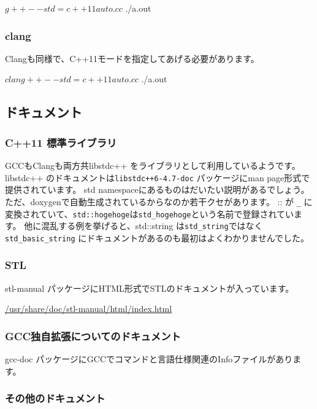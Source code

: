 \documentclass[mingoth,a4paper]{jsarticle}
\begin{document}
\begin{commandline}
$ g++ --std=c++11 auto.cc
$ ./a.out
\end{commandline}

\subsubsection{clang}

Clangも同様で、C++11モードを指定してあげる必要があります。

\begin{commandline}
$ clang++ --std=c++11 auto.cc 
$ ./a.out
\end{commandline}

\subsection{ドキュメント}

\subsubsection{C++11 標準ライブラリ}

GCCもClangも両方共libstdc++ をライブラリとして利用しているようです。
libstdc++ のドキュメントは\texttt{libstdc++6-4.7-doc} パッケージにman
page形式で提供されています。
std namespaceにあるものはだいたい説明があるでしょう。
ただ、doxygenで自動生成されているからなのか若干クセがあります。
:: が \verb!_! に変換されていて、\verb!std::hogehoge!は\verb!std_hogehoge!という名前で登録されています。
他に混乱する例を挙げると、std::string は\verb!std_string!ではなく
\verb!std_basic_string! にドキュメントがあるのも最初はよくわかりませんでした。

\subsubsection{STL}

stl-manual パッケージにHTML形式でSTLのドキュメントが入っています。

\url{/usr/share/doc/stl-manual/html/index.html}

\subsubsection{GCC独自拡張についてのドキュメント}

gcc-doc パッケージにGCCでコマンドと言語仕様関連のInfoファイルがあります。

\subsubsection{その他のドキュメント}
\end{document}
